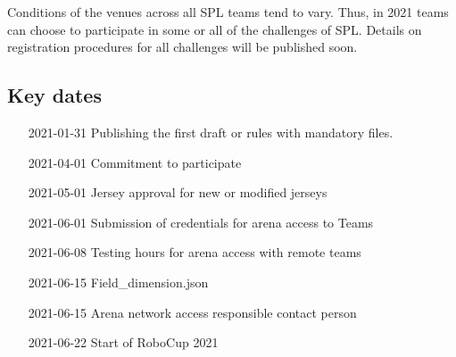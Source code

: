 Conditions of the venues across all SPL teams tend to vary. Thus, in 2021 teams can choose to participate in some or all of the challenges of SPL. Details on registration procedures for all challenges will be published soon.

\subsection{Key dates}

\begin{itemize}[leftmargin=*,labelsep=0.7cm, labelindent=2cm]
    \item [2021-01-31] Publishing the first draft or rules with mandatory files.
    \item [2021-04-01] Commitment to participate
    \item [2021-05-01] Jersey approval for new or modified jerseys
    \item [2021-06-01] Submission of credentials for arena access to Teams
    \item [2021-06-08] Testing hours for arena access with remote teams
    \item [2021-06-15] Field\_dimension.json
    \item [2021-06-15] Arena network access responsible contact person
    \item [2021-06-22] Start of RoboCup 2021
\end{itemize}
